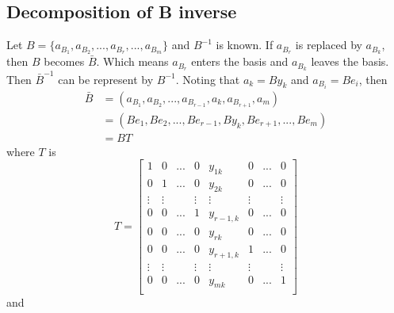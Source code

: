         \subsection{Decomposition of B inverse}
            Let $B=\{ a_{B_1}, a_{B_2}, ..., a_{B_r}, ..., a_{B_m}\}$ and $B^{-1}$ is known.
            If $a_{B_r}$ is replaced by $a_{B_k}$, then $B$ becomes $\bar{B}$. Which means $a_{B_r}$ enters the basis and $a_{B_k}$ leaves the basis. \\
            Then $\bar{B}^{-1}$ can be represent by $B^{-1}$. Noting that $a_k=By_k$ and $a_{B_i}=Be_i$, then
            \begin{align}
                \bar{B} & = (a_{B_1}, a_{B_2}, ...,a_{B_{r-1}}, a_k, a_{B_{r+1}}, a_m) \nonumber \\
                & = (Be_1, Be_2, ..., Be_{r-1}, By_k, Be_{r+1}, ..., Be_m) \nonumber \\
                & = BT \nonumber
            \end{align}
            where $T$ is
            \begin{equation}
                T=\left[ \begin{array}{cccccccc}
                    1 & 0 & ... & 0 & y_{1k} & 0 & ... & 0 \\
                    0 & 1 & ... & 0 &  y_{2k} & 0 & ... & 0 \\
                    \vdots & \vdots & & \vdots & \vdots & \vdots & & \vdots \\
                    0 & 0 & ... & 1 & y_{r-1,k} & 0 & ... & 0 \\
                    0 & 0 & ... & 0 & y_{rk} & 0 & ... & 0 \\
                    0 & 0 & ... & 0 &  y_{r+1,k} & 1 & ... & 0 \\
                    \vdots & \vdots & & \vdots & \vdots & \vdots & & \vdots \\
                    0 & 0 & ... & 0 &  y_{mk}& 0 & ... & 1 \\
                \end{array} \right] \nonumber
            \end{equation}
            and 
